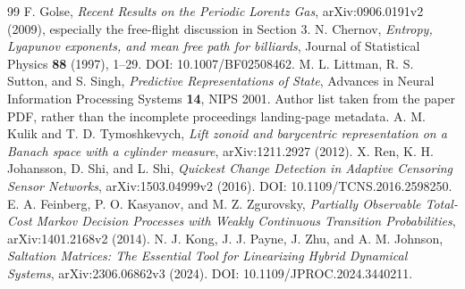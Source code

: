 \begin{thebibliography}{99}
 F. Golse, \emph{Recent Results on the Periodic Lorentz Gas},
arXiv:0906.0191v2 (2009), especially the free-flight discussion in Section 3.
 N. Chernov, \emph{Entropy, Lyapunov exponents, and mean free
path for billiards}, Journal of Statistical Physics \textbf{88} (1997),
1--29. DOI: 10.1007/BF02508462.
 M. L. Littman, R. S. Sutton, and S. Singh,
\emph{Predictive Representations of State}, Advances in Neural Information
Processing Systems \textbf{14}, NIPS 2001. Author list taken from the paper
PDF, rather than the incomplete proceedings landing-page metadata.
 A. M. Kulik and T. D. Tymoshkevych,
\emph{Lift zonoid and barycentric representation on a Banach space with a
cylinder measure}, arXiv:1211.2927 (2012).
 X. Ren, K. H. Johansson, D. Shi, and L. Shi,
\emph{Quickest Change Detection in Adaptive Censoring Sensor Networks},
arXiv:1503.04999v2 (2016). DOI: 10.1109/TCNS.2016.2598250.
 E. A. Feinberg, P. O. Kasyanov, and M. Z. Zgurovsky,
\emph{Partially Observable Total-Cost Markov Decision Processes with Weakly
Continuous Transition Probabilities}, arXiv:1401.2168v2 (2014).
 N. J. Kong, J. J. Payne, J. Zhu, and A. M. Johnson,
\emph{Saltation Matrices: The Essential Tool for Linearizing Hybrid Dynamical
Systems}, arXiv:2306.06862v3 (2024). DOI: 10.1109/JPROC.2024.3440211.
\end{thebibliography}
